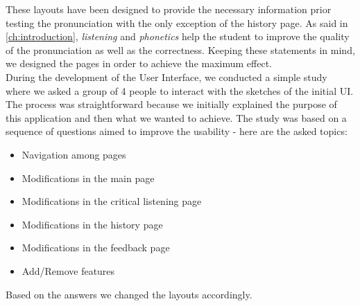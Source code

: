 \noindent These layouts have been designed to provide the necessary information prior testing the pronunciation with the only exception of the history page. As said in \ref{ch:introduction}, \textit{listening} and \textit{phonetics} help the student to improve the quality of the pronunciation as well as the correctness. Keeping these statements in mind, we designed the pages in order to achieve the maximum effect. \\

\noindent During the development of the User Interface, we conducted a simple study where we asked a group of 4 people to interact with the sketches of the initial UI. The process was straightforward because we initially explained the purpose of this application and then what we wanted to achieve. The study was based on a sequence of questions aimed to improve the usability - here are the asked topics:

\begin{itemize}
	\item Navigation among pages
	\item Modifications in the main page
	\item Modifications in the critical listening page
	\item Modifications in the history page
	\item Modifications in the feedback page
	\item Add/Remove features
\end{itemize}

\noindent Based on the answers we changed the layouts accordingly.

